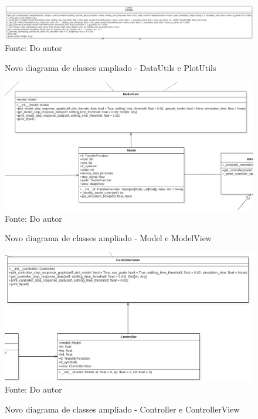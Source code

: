 \begin{figure}[H]
    \centering
    \caption{Novo diagrama de classes ampliado - DataUtils e PlotUtils}
    \includegraphics[scale=0.22]{figuras/class_diag_pu_new}
    \label{fig:class_diag_pu_new}
    \\
    \vspace{0cm}\hspace{0cm}\small{Fonte: Do autor}
\end{figure}

\begin{figure}[H]
    \centering
    \caption{Novo diagrama de classes ampliado - Model e ModelView}
    \includegraphics[scale=0.32]{figuras/class_diag_model_new}
    \label{fig:class_diag_model_new}
    \\
    \vspace{0cm}\hspace{0cm}\small{Fonte: Do autor}
\end{figure}

\begin{figure}[H]
    \centering
    \caption{Novo diagrama de classes ampliado - Controller e ControllerView}
    \includegraphics[scale=0.35]{figuras/class_diag_controller_new}
    \label{fig:class_diag_controller_new}
    \\
    \vspace{0cm}\hspace{0cm}\small{Fonte: Do autor}
\end{figure}

